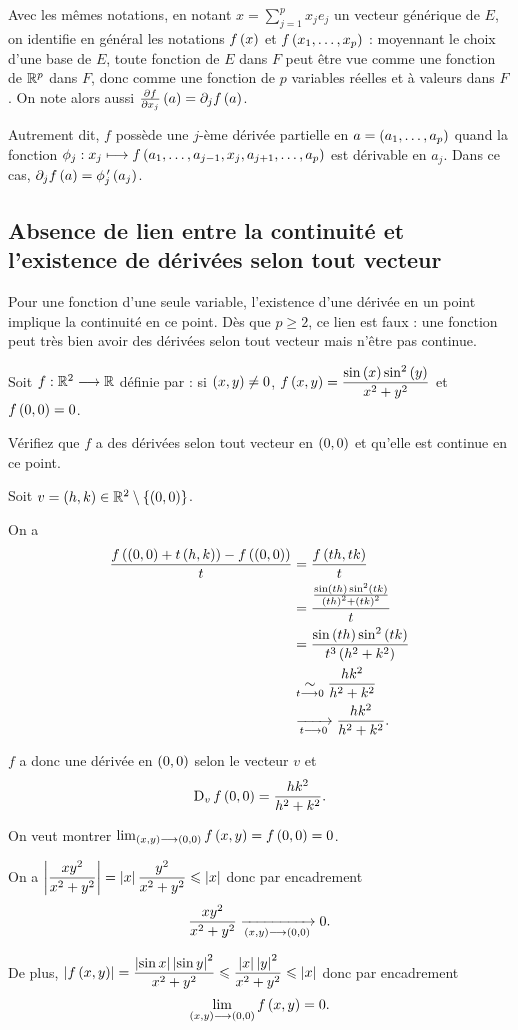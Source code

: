 Avec les mêmes notations, en notant \(x=\sum_{j=1}^px_je_j\) un vecteur générique de \(E\), on identifie en général les notations \(f\left(x\right)\) et \(f\left(x_1,\dots,x_p\right)\) : moyennant le choix d'une base de \(E\), toute fonction de \(E\) dans \(F\) peut être vue comme une fonction de \(\mathbb{R}^p\) dans \(F\), donc comme une fonction de \(p\) variables réelles et à valeurs dans \(F\). On note alors aussi \(\pdv{f}{x_j}\paren{a}=\pdif{j}f\paren{a}\).

Autrement dit, \(f\) possède une \(j\)-ème dérivée partielle en \(a=\left(a_1,\dots,a_p\right)\) quand la fonction \(\phi_j:x_j\longmapsto f\left(a_1,\dots,a_{j-1},x_j,a_{j+1},\dots,a_p\right)\) est dérivable en \(a_j\). Dans ce cas, \(\pdif{j}f\paren{a}=\phi_j\prim\paren{a_j}\).

\subsection{Absence de lien entre la continuité et l'existence de dérivées selon tout vecteur}

Pour une fonction d'une seule variable, l'existence d'une dérivée en un point implique la continuité en ce point. Dès que \(p\geq2\), ce lien est faux : une fonction peut très bien avoir des dérivées selon tout vecteur mais n'être pas continue.

\begin{exo}
Soit \(f:\mathbb{R}^2\longrightarrow\mathbb{R}\) définie par : si \(\left(x,y\right)\not=0\), \(f\left(x,y\right)=\dfrac{\sin\left(x\right)\sin^2\left(y\right)}{x^2+y^2}\) et \(f\left(0,0\right)=0\).

Vérifiez que \(f\) a des dérivées selon tout vecteur en \(\left(0,0\right)\) et qu'elle est continue en ce point.
\end{exo}

\begin{corr}
Soit \(v=\left(h,k\right)\in\mathbb{R}^2\setminus\left\lbrace\left(0,0\right)\right\rbrace\).

On a \[\begin{aligned}
\dfrac{f\left(\left(0,0\right)+t\left(h,k\right)\right)-f\left(\left(0,0\right)\right)}{t}&=\dfrac{f\left(th,tk\right)}{t} \\
&=\dfrac{\frac{\sin\left(th\right)\sin^2\left(tk\right)}{\left(th\right)^2+\left(tk\right)^2}}{t} \\
&=\dfrac{\sin\left(th\right)\sin^2\left(tk\right)}{t^3\left(h^2+k^2\right)} \\
&\underset{t\longrightarrow0}{\sim}\dfrac{hk^2}{h^2+k^2} \\
&\xrightarrow[t\longrightarrow0]{}\dfrac{hk^2}{h^2+k^2}.
\end{aligned}\]

\(f\) a donc une dérivée en \(\left(0,0\right)\) selon le vecteur \(v\) et \[\operatorname{D}_{v}f\left(0,0\right)=\dfrac{hk^2}{h^2+k^2}.\]

On veut montrer \(\lim_{\left(x,y\right)\longrightarrow\left(0,0\right)}f\left(x,y\right)=f\left(0,0\right)=0\).

On a \(\left\lvert\dfrac{xy^2}{x^2+y^2}\right\rvert=\left\lvert x\right\rvert\dfrac{y^2}{x^2+y^2}\leqslant\left\lvert x\right\rvert\) donc par encadrement \[\dfrac{xy^2}{x^2+y^2}\xrightarrow[\left(x,y\right)\longrightarrow\left(0,0\right)]{}0.\]

De plus, \(\left\lvert f\left(x,y\right)\right\rvert=\dfrac{\left\lvert\sin x\right\rvert\left\lvert\sin y\right\rvert^2}{x^2+y^2}\leqslant\dfrac{\left\lvert x\right\rvert\left\lvert y\right\rvert^2}{x^2+y^2}\leqslant\left\lvert x\right\rvert\) donc par encadrement \[\lim_{\left(x,y\right)\longrightarrow\left(0,0\right)}f\left(x,y\right)=0.\]
\end{corr}

